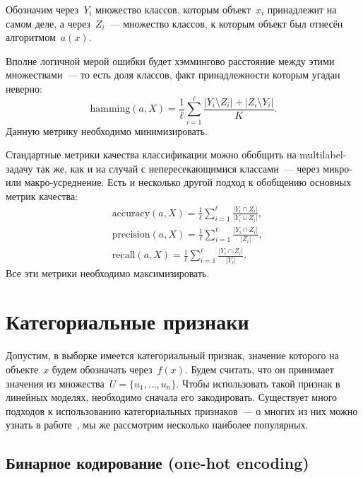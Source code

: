 \documentclass[12pt,fleqn]{article}
\begin{document}
Обозначим через~$Y_i$ множество классов, которым объект~$x_i$ принадлежит на самом деле,
а через~$Z_i$~--- множество классов, к которым объект был отнесён алгоритмом~$a(x)$.

Вполне логичной мерой ошибки будет хэммингово расстояние между этими множествами~---
то есть доля классов, факт принадлежности которым угадан неверно:
\[
    \text{hamming}(a, X)
    =
    \frac{1}{\ell}
    \sum_{i = 1}^{\ell}
        \frac{
            |Y_i \setminus Z_i| + |Z_i \setminus Y_i|
        }{
            K
        }.
\]
Данную метрику необходимо минимизировать.

Стандартные метрики качества классификации можно обобщить на multilabel-задачу так же,
как и на случай с непересекающимися классами~--- через микро- или макро-усреднение.
Есть и несколько другой подход к обобщению основных метрик качества:
\begin{align*}
    &\text{accuracy}(a, X)
    =
    \frac{1}{\ell}
    \sum_{i = 1}^{\ell}
        \frac{
            |Y_i \cap Z_i|
        }{
            |Y_i \cup Z_i|
        },\\
    &\text{precision}(a, X)
    =
    \frac{1}{\ell}
    \sum_{i = 1}^{\ell}
        \frac{
            |Y_i \cap Z_i|
        }{
            |Z_i|
        },\\
    &\text{recall}(a, X)
    =
    \frac{1}{\ell}
    \sum_{i = 1}^{\ell}
        \frac{
            |Y_i \cap Z_i|
        }{
            |Y_i|
        }.
\end{align*}
Все эти метрики необходимо максимизировать.

\section{Категориальные признаки}

Допустим, в выборке имеется категориальный признак,
значение которого на объекте~$x$ будем обозначать через~$f(x)$.
Будем считать, что он принимает значения из множества~$U = \{u_1, \dots, u_n\}$.
Чтобы использовать такой признак в линейных моделях, необходимо сначала его закодировать.
Существует много подходов к использованию категориальных признаков~---
о многих из них можно узнать в работе~\cite{dj14categorical},
мы же рассмотрим несколько наиболее популярных.

\subsection{Бинарное кодирование (one-hot encoding)}
\end{document}

